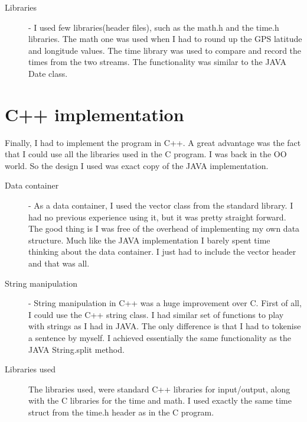\documentclass[a4paper]{article}
\begin{document}
\begin{description}
  \item[Libraries] - I used few libraries(header files), such as the math.h and the time.h libraries. The math one was used when I had to round up the GPS latitude and longitude values. The time library was used to compare and record the times from the two streams. The functionality was similar to the JAVA Date class.
\end{description}

\section{C++ implementation}


Finally, I had to implement the program in C++. A great advantage was the fact that I could use all the libraries used in the C program. I was back in the OO world. So the design I used was exact copy of the JAVA implementation.
\begin{description}
  \item[Data container] - As a data container, I used the vector class from the standard library. I had no previous experience using it, but it was pretty straight forward. The good thing is I was free of the overhead of implementing my own data structure. Much like the JAVA implementation I barely spent time thinking about the data container. I just had to include the vector header and that was all.
\item[String manipulation] - String manipulation in C++ was a huge improvement over C. First of all, I could use the C++ string class. I had similar set of functions to play with strings as I had in JAVA. The only difference is that I had to tokenise a sentence by myself. I achieved essentially the same functionality as the JAVA String.split method.
\item[Libraries used] The libraries used, were standard C++ libraries for input/output, along with the C libraries for the time and math. I used exactly the same time struct from the time.h header as in the C program. 
\end{description}
\end{document}
